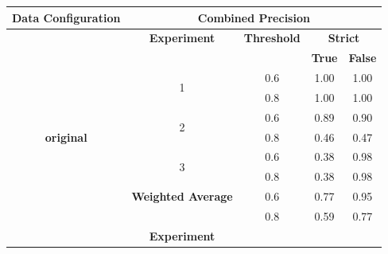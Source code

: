 \documentclass{mpaper}
\begin{document}
\begin{table}[]
\centering
\begin{tabular}{|c|cccc|}
\hline
\textbf{Data Configuration} & \multicolumn{4}{c|}{\textbf{Combined Precision}}                                                                                \\ \hline
\textbf{}                   & \multicolumn{1}{c|}{\textbf{Experiment}}       & \multicolumn{1}{c|}{\textbf{Threshold}} & \multicolumn{2}{c|}{\textbf{Strict}} \\ \cline{2-5} 
                            & \multicolumn{1}{l|}{}                          & \multicolumn{1}{c|}{}                   & \textbf{True}    & \textbf{False}    \\ \cline{2-5} 
                            & \multicolumn{1}{c|}{\multirow{2}{*}{1}}        & \multicolumn{1}{c|}{0.6}                & 1.00             & 1.00              \\
                            & \multicolumn{1}{c|}{}                          & \multicolumn{1}{c|}{0.8}                & 1.00             & 1.00              \\ \cline{2-5} 
                            & \multicolumn{1}{c|}{\multirow{2}{*}{2}}        & \multicolumn{1}{c|}{0.6}                & 0.89             & 0.90              \\
\textbf{original}           & \multicolumn{1}{c|}{}                          & \multicolumn{1}{c|}{0.8}                & 0.46             & 0.47              \\ \cline{2-5} 
                            & \multicolumn{1}{c|}{\multirow{2}{*}{3}}        & \multicolumn{1}{c|}{0.6}                & 0.38             & 0.98              \\
                            & \multicolumn{1}{c|}{}                          & \multicolumn{1}{c|}{0.8}                & 0.38             & 0.98              \\ \cline{2-5} 
                            & \multicolumn{1}{c|}{\textbf{Weighted Average}} & \multicolumn{1}{c|}{0.6}                & 0.77             & 0.95              \\
                            & \multicolumn{1}{c|}{}                          & \multicolumn{1}{c|}{0.8}                & 0.59             & 0.77              \\ \hline
                            & \multicolumn{1}{c|}{\textbf{Experiment}}       & \multicolumn{1}{c|}{}                   &                  &                   \\ \cline{2-5} 

\end{tabular}
\end{table}
\end{document}
